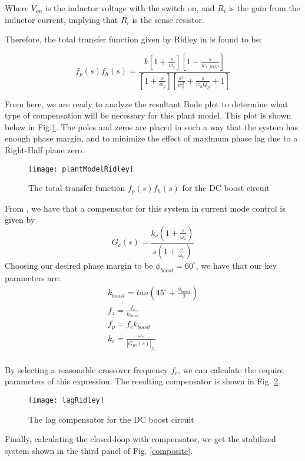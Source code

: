 Where $V_{on}$ is the inductor voltage with the switch on, and $R_i$ is the gain from the inductor current, implying that $R_i$ is the sense resistor.

Therefore, the total transfer function given by Ridley in \cite{ridley} is found to be:

\begin{equation}
\label{thirdOrder}
f_p(s)f_h(s)=\frac{k[1 + \frac{s}{w_z}][1 - \frac{s}{w_{z,RHP}}]}{[1 + \frac{s}{w_p}][\frac{s^2}{w_n^2} + \frac{s}{w_nQ_p} + 1]}
\end{equation}

From here, we are ready to analyze the resultant Bode plot to determine what type of compensation will be necessary for this plant model. This plot is shown below in Fig.\ref{plantModelRidley}.
The poles and zeros are placed in such a way that the system has enough phase margin, and to minimize the effect of maximum phase lag due to a Right-Half plane zero.

\begin{figure}[htbp]
\begin{center}
\texttt{[image: plantModelRidley]}
\caption{The total transfer function $f_p(s)f_h(s)$ for the DC boost circuit}
\label{plantModelRidley}
\end{center}
\end{figure}

From \cite{mohan}, we have that a compensator for this system in current mode control is given by
\begin{equation}
G_c(s) = \frac{k_c(1 + \frac{s}{\omega_z})}{s(1+\frac{s}{\omega_p})}
\end{equation}
Choosing our desired phase margin to be $\phi_{boost} = 60^{\circ}$, we have that our key parameters are:
\begin{gather*}
k_{boost} = tan(45^{\circ}+\frac{\phi_{boost}}{2})\\
f_z = \frac{f_c}{k_{boost}}\\
f_p = f_ck_{boost}\\
k_{c} = \frac{\omega_z}{|G_{ps}(s)|_{f_c}}\\
\end{gather*}

By selecting a reasonable crossover frequency $f_c$, we can calculate the require parameters of this expression. The resulting compensator is shown in Fig. \ref{lagRidley}.
\begin{figure}[htbp]
\begin{center}
\texttt{[image: lagRidley]}
\caption{The lag compensator for the DC boost circuit}
\label{lagRidley}
\end{center}
\end{figure}
Finally, calculating the closed-loop with compensator, we get the stabilized system shown in the third panel of Fig. \ref{composite}. 

